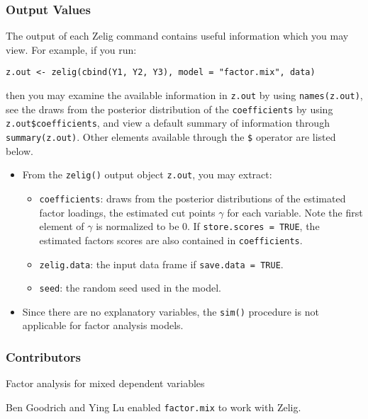 \subsubsection{Output Values}

The output of each Zelig command contains useful information which you may
view. For example, if you run:
\begin{verbatim}
z.out <- zelig(cbind(Y1, Y2, Y3), model = "factor.mix", data)
\end{verbatim}

\noindent then you may examine the available information in \texttt{z.out} by
using \texttt{names(z.out)}, see the draws from the posterior distribution of
the \texttt{coefficients} by using \texttt{z.out\$coefficients}, and view a default
summary of information through \texttt{summary(z.out)}. Other elements
available through the \texttt{\$} operator are listed below.

\begin{itemize}
\item From the \texttt{zelig()} output object \texttt{z.out}, you may extract:

\begin{itemize}
\item \texttt{coefficients}: draws from the posterior distributions
of the estimated factor loadings, the estimated cut points $\gamma$ for each
variable. Note the first element of $\gamma$ is normalized to be 0. If 
\texttt{store.scores = TRUE}, the estimated factors scores are also contained in 
\texttt{coefficients}.

   \item {\tt zelig.data}: the input data frame if {\tt save.data = TRUE}.  
\item \texttt{seed}: the random seed used in the model.   

\end{itemize}

\item Since there are no explanatory variables, the \texttt{sim()} procedure is
not applicable for factor analysis models.

\end{itemize}

\subsubsection{Contributors}
Factor analysis for mixed dependent variables 

\noindent Ben Goodrich and Ying Lu enabled \texttt{factor.mix} to work with Zelig.


